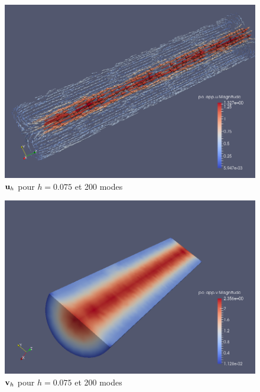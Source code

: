 \documentclass[a4paper,11pt]{article}
\begin{document}
\begin{figure}[H]
  \centering
  \includegraphics[scale=0.4]{u200}
  \caption{${\mathbf{u}}_h$ pour $h=0.075$ et 200 modes}
\end{figure}
\begin{figure}[H]
  \centering
  \includegraphics[scale=0.4]{v200}
  \caption{${\mathbf{v}}_h$ pour $h=0.075$ et 200 modes}
\end{figure}
\end{document}
